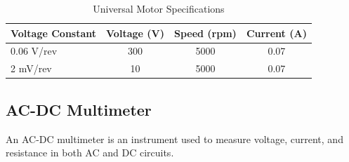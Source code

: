 \documentclass[a4paper,12pt]{article}
\begin{document}
	\begin{table}[H]
		\centering
		\caption{Universal Motor Specifications}
		\begin{tabular}{|l|c|c|c|}
		\hline
		\textbf{Voltage Constant} & \textbf{Voltage (V)} & \textbf{Speed (rpm)} & \textbf{Current (A)} \\
		\hline
		0.06 V/rev & 300 & 5000 & 0.07 \\ \hline
		2 mV/rev   & 10  & 5000 & 0.07 \\ \hline
	\end{tabular}
	\end{table}

	
	\subsection{AC-DC Multimeter}
	An AC-DC multimeter is an instrument used to measure voltage, current, and resistance in both AC and DC circuits.
\end{document}
